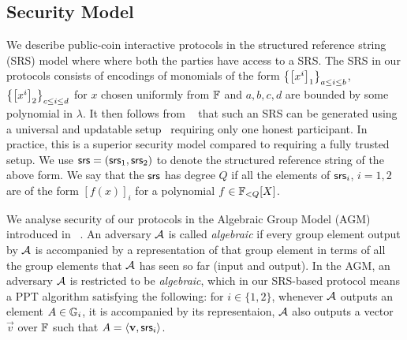 \subsection{Security Model} We describe public-coin interactive protocols in the structured reference string (SRS) model where
where both the parties have access to a SRS. The SRS in our protocols consists of
encodings of monomials of the form $\left\{\left[{x^i}\right]_1\right\}_{a\leq i\leq b}$, $\left\{\left[{x^i}\right]_2\right\}_{c\leq i\leq d}$
for $x$ chosen uniformly from $\mathbb{F}$ and $a,b,c,d$ are bounded by some polynomial in $\lambda$. It then follows
from ~\cite{EPRINT:BowGabMie17} that such an SRS can be generated using a universal and updatable setup~\cite{C:GKMMM18} requiring
only one honest participant. In practice, this is a superior security model compared to requiring a fully
trusted setup. We use $\mathsf{srs} = (\mathsf{srs}_1,\mathsf{srs}_2)$ to denote the structured reference string of the above form. We say
that the $\mathsf{srs}$ has degree $Q$ if all the elements of $\mathsf{srs}_i$, $i=1,2$ are of the form $[f(x)]_i$ for a
polynomial $f\in \mathbb{F}_{<Q}[X]$.

\smallskip

We analyse security of our protocols in the Algebraic Group Model (AGM) introduced
in ~\cite{C:FucKilLos18}. An adversary $\mathcal{A}$ is called \textit{algebraic} if every group element output by $\mathcal{A}$ is accompanied by a representation of that group element in terms of all the group elements that $\mathcal{A}$ has seen so far (input and output).
In the AGM, an adversary $\mathcal{A}$ is restricted to be {\em algebraic}, which in our SRS-based protocol means a PPT algorithm satisfying the following:
for $i\in \{1,2\}$, whenever $\mathcal{A}$ outputs an element $A\in \mathbb{G}_i$, it is accompanied by its representaion, $\mathcal{A}$ also outputs a vector $\vec{v}$
	over $\mathbb{F}$ such that $A=\langle \mathbf{v},\mathsf{srs}_i\rangle$.

